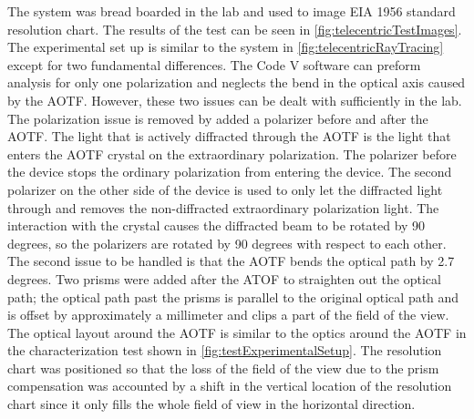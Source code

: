 The system was bread boarded in the lab and used to image EIA 1956 standard resolution chart. The results of the test can be seen in \autoref{fig:telecentricTestImages}. The experimental set up is similar to the system in \autoref{fig:telecentricRayTracing} except for two fundamental differences. The Code V software can preform analysis for only one polarization and neglects the bend in the optical axis caused by the AOTF. However, these two issues can be dealt with sufficiently in the lab. The polarization issue is removed by added a polarizer before and after the AOTF. The light that is actively diffracted through the AOTF is the light that enters the AOTF crystal on the extraordinary polarization. The polarizer before the device stops the ordinary polarization from entering the device. The second polarizer on the other side of the device is used to only let the diffracted light through and removes the non-diffracted extraordinary polarization light. The interaction with the crystal causes the diffracted beam to be rotated by 90 degrees, so the polarizers are rotated by 90 degrees with respect to each other. The second issue to be handled is that the AOTF bends the optical path by 2.7 degrees. Two prisms were added after the ATOF to straighten out the optical path; the optical path past the prisms is parallel to the original optical path and is offset by approximately a millimeter and clips a part of the field of the view. The optical layout around the AOTF is similar to the optics around the AOTF in the characterization test shown in \autoref{fig:testExperimentalSetup}. The resolution chart was positioned so that the loss of the field of the view due to the prism compensation was accounted by a shift in the vertical location of the resolution chart since it only fills the whole field of view in the horizontal direction.


